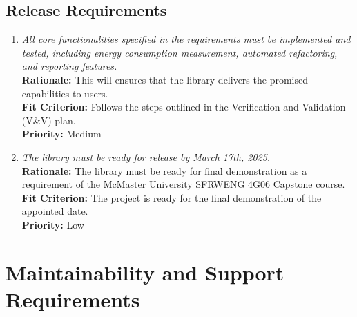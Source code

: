 \documentclass[12pt]{article}
\begin{document}
\subsection{Release Requirements}
\begin{enumerate}[label=OER-RL \arabic*., wide=0pt, leftmargin=*]
	\item \emph{All core functionalities specified in the requirements must be implemented and tested, including energy consumption measurement, automated refactoring, and reporting features.}\\
    {\bf Rationale:} This will ensures that the library delivers the promised capabilities to users.\\
    {\bf Fit Criterion:} Follows the steps outlined in the Verification and Validation (V\&V) plan.  \\
    {\bf Priority:} Medium
  \item \emph{The library must be ready for release by March 17th, 2025.}\\
    {\bf Rationale:} The library must be ready for final demonstration as a requirement of the McMaster University SFRWENG 4G06 Capstone course.\\
    {\bf Fit Criterion:} The project is ready for the final demonstration of the appointed date.\\
    {\bf Priority:} Low
\end{enumerate}

\section{Maintainability and Support Requirements}
\end{document}
